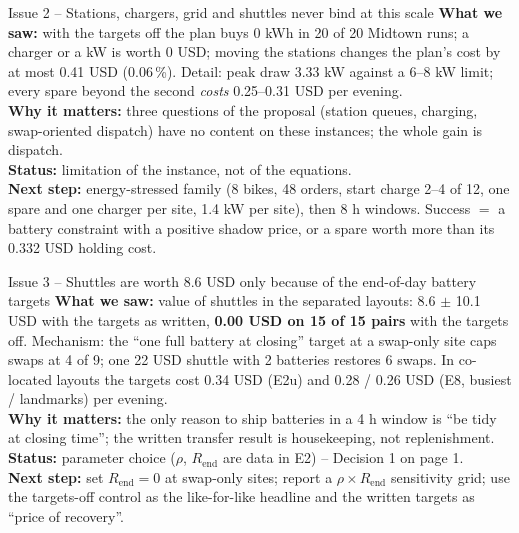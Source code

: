 \begin{issuebox}{Issue 2 -- Stations, chargers, grid and shuttles never bind at this scale}
\textbf{What we saw:} with the targets off the plan buys 0 kWh in 20 of 20 Midtown runs; a charger or a kW is worth 0 USD; moving the stations changes the plan's cost by at most 0.41 USD (0.06\,\%). Detail: peak draw 3.33 kW against a 6--8 kW limit; every spare beyond the second \emph{costs} 0.25--0.31 USD per evening.\\
\textbf{Why it matters:} three questions of the proposal (station queues, charging, swap-oriented dispatch) have no content on these instances; the whole gain is dispatch.\\
\textbf{Status:} limitation of the instance, not of the equations.\\
\textbf{Next step:} energy-stressed family (8 bikes, 48 orders, start charge 2--4 of 12, one spare and one charger per site, 1.4 kW per site), then 8 h windows. Success $=$ a battery constraint with a positive shadow price, or a spare worth more than its 0.332 USD holding cost.
\end{issuebox}

\begin{issuebox}{Issue 3 -- Shuttles are worth 8.6 USD only because of the end-of-day battery targets}
\textbf{What we saw:} value of shuttles in the separated layouts: 8.6 $\pm$ 10.1 USD with the targets as written, \textbf{0.00 USD on 15 of 15 pairs} with the targets off. Mechanism: the ``one full battery at closing'' target at a swap-only site caps swaps at 4 of 9; one 22 USD shuttle with 2 batteries restores 6 swaps. In co-located layouts the targets cost 0.34 USD (E2u) and 0.28 / 0.26 USD (E8, busiest / landmarks) per evening.\\
\textbf{Why it matters:} the only reason to ship batteries in a 4 h window is ``be tidy at closing time''; the written transfer result is housekeeping, not replenishment.\\
\textbf{Status:} parameter choice ($\rho$, $R_{\mathrm{end}}$ are data in E2) -- Decision 1 on page 1.\\
\textbf{Next step:} set $R_{\mathrm{end}} = 0$ at swap-only sites; report a $\rho \times R_{\mathrm{end}}$ sensitivity grid; use the targets-off control as the like-for-like headline and the written targets as ``price of recovery''.
\end{issuebox}

